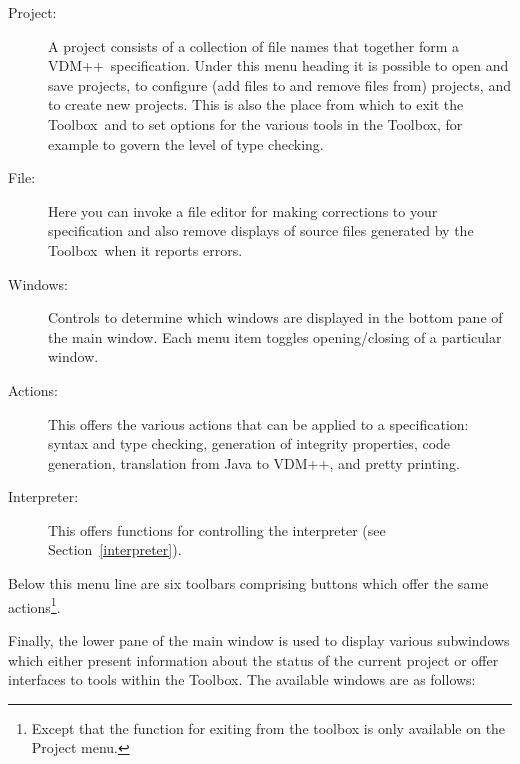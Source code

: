 \documentclass[\pformat,12pt]{article}
\newcommand{\vdmslpp}{VDM++}
\newcommand{\Toolbox}{Toolbox}
\newcommand{\guicmd}[1]{{\sf #1}}
\begin{document}
\begin{description}
\item[\guicmd{Project}:] A project consists of a
  collection of file  
  names that together form a \vdmslpp\ specification. Under this menu
  heading it is possible to open and save projects, to configure (add
  files to and remove files from) projects, and to create new
  projects. This is also the place from which to exit the \Toolbox\
  and to set options for the various tools in the \Toolbox, for
  example to govern the level of type checking.

\item[\guicmd{File}:] Here you can invoke a file editor for making
  corrections to your specification and also remove displays of source
  files generated by the \Toolbox\ when it reports errors.

\item[\guicmd{Windows}:] Controls to determine which windows are
  displayed in the bottom pane of the main window. Each menu item
  toggles opening/closing of a particular window.

\item[\guicmd{Actions}:] This offers the various
  actions that can be applied to a specification: syntax and type
  checking, generation of integrity properties, code generation, 
translation from Java to \vdmslpp, 
and pretty printing.

\item[\guicmd{Interpreter}:] This offers
  functions for controlling the interpreter (see Section~\ref{interpreter}).
\end{description}

  Below this menu line are six toolbars comprising buttons which offer the same
  actions\footnote{Except that the function for exiting from the toolbox
  is only available on the \guicmd{Project} menu.}.
  
  Finally, the lower pane of the main window is used to display various
  subwindows which either present information about the status of the
  current project or offer interfaces to tools within the \Toolbox. The
  available windows are as follows:
\end{document}
